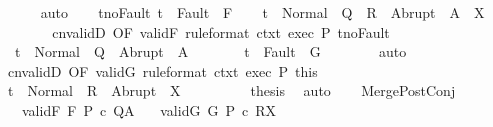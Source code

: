 \begin{isabellebody}
\ \ \ \ \isamarkupfalse%
\ auto\isanewline
\ \ \isamarkupfalse%
\ t{\isacharunderscore}noFault{\isacharcolon}\ {\isachardoublequoteopen}t\ {\isasymnotin}\ Fault\ {\isacharbackquote}\ F{\isachardoublequoteclose}\isanewline
\ \ \isamarkupfalse%
\ {\isachardoublequoteopen}t\ {\isasymin}\ Normal\ {\isacharbackquote}\ {\isacharparenleft}Q\ {\isasyminter}\ R{\isacharparenright}\ {\isasymunion}\ Abrupt\ {\isacharbackquote}\ {\isacharparenleft}A\ {\isasyminter}\ X{\isacharparenright}{\isachardoublequoteclose}\isanewline
\ \ \isamarkupfalse%
\ {\isacharminus}\isanewline
\ \ \ \ \isamarkupfalse%
\ cnvalidD\ {\isacharbrackleft}OF\ validF\ {\isacharbrackleft}rule{\isacharunderscore}format{\isacharbrackright}\ ctxt\ exec\ P\ t{\isacharunderscore}noFault{\isacharbrackright}\isanewline
\ \ \ \ \isamarkupfalse%
\ {\isacharasterisk}{\isacharcolon}\ {\isachardoublequoteopen}t\ {\isasymin}\ Normal\ {\isacharbackquote}\ Q\ {\isasymunion}\ Abrupt\ {\isacharbackquote}\ A{\isachardoublequoteclose}\isacommand{{\isachardot}}\isamarkupfalse%
\isanewline
\ \ \ \ \isamarkupfalse%
\ \isamarkupfalse%
\ {\isachardoublequoteopen}t\ {\isasymnotin}\ Fault\ {\isacharbackquote}\ G{\isachardoublequoteclose}\isanewline
\ \ \ \ \ \ \isamarkupfalse%
\ auto\isanewline
\ \ \ \ \isamarkupfalse%
\ cnvalidD\ {\isacharbrackleft}OF\ validG\ {\isacharbrackleft}rule{\isacharunderscore}format{\isacharbrackright}\ ctxt{\isacharprime}\ exec\ P{\isacharprime}\ this{\isacharbrackright}\isanewline
\ \ \ \ \isamarkupfalse%
\ {\isachardoublequoteopen}t\ {\isasymin}\ Normal\ {\isacharbackquote}\ R\ {\isasymunion}\ Abrupt\ {\isacharbackquote}\ X{\isachardoublequoteclose}\ \isacommand{{\isachardot}}\isamarkupfalse%
\isanewline
\ \ \ \ \isamarkupfalse%
\ {\isacharasterisk}\ \isamarkupfalse%
\ {\isacharquery}thesis\ \isamarkupfalse%
\ auto\isanewline
\ \ \isamarkupfalse%
\isanewline
{}\isamarkupfalse%
%
\endisatagproof
{\isafoldproof}%
%
\isadelimproof
\isanewline
%
\endisadelimproof
\isanewline
{}\isamarkupfalse%
\ Merge{\isacharunderscore}PostConj{\isacharcolon}\ \isanewline
\ \ \ validF{\isacharcolon}\ {\isachardoublequoteopen}{\isasymGamma}{\isacharcomma}{\isasymTheta}{\isasymturnstile}\isactrlbsub {\isacharslash}F\isactrlesub \ P\ c\ Q{\isacharcomma}A{\isachardoublequoteclose}\isanewline
\ \ \ validG{\isacharcolon}\ {\isachardoublequoteopen}{\isasymGamma}{\isacharcomma}{\isasymTheta}{\isasymturnstile}\isactrlbsub {\isacharslash}G\isactrlesub \ P{\isacharprime}\ c\ R{\isacharcomma}X{\isachardoublequoteclose}\isanewline

\end{isabellebody}
